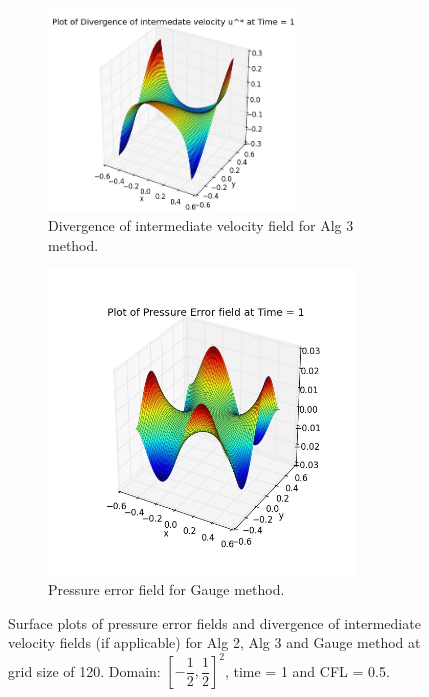 \begin{figure}[H]
	\quad
	\begin{subfigure}[t]{2.6in}
		\centering
		\includegraphics[width=2.6in]{figures/Pm2_pf2b_np_div_uvstar_t_1_grid_60.jpg}
		\caption{Divergence of intermediate velocity field for Alg 3 method.}\label{fig:6.11d}
	\end{subfigure}
	\quad
	\begin{subfigure}[t]{3.2in}
		\centering
		\includegraphics[width=3.2in]{figures/Gauge_pf2b_P_error_t_1_grid_60_corrected.jpg}
		\caption{Pressure error field for Gauge method. }\label{fig:6.11e}
	\end{subfigure}
	\caption{Surface plots of pressure error fields and divergence of intermediate velocity fields (if applicable) for Alg 2, Alg 3 and Gauge method at grid size of 120. Domain: $[-\dfrac{1}{2},\dfrac{1}{2}]^2$, time = 1 and CFL = 0.5. }\label{fig:6.11}
\end{figure}

